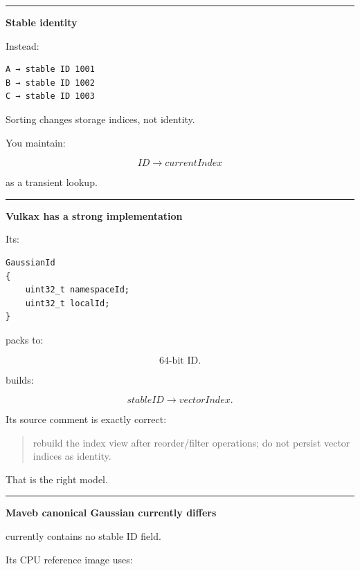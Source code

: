 \begin{center}\rule{0.5\linewidth}{0.5pt}\end{center}

\textbf{Stable identity}

Instead:

\protect{}\label{juc7yl}%
\begin{verbatim}
A → stable ID 1001
B → stable ID 1002
C → stable ID 1003
\end{verbatim}

Sorting changes storage indices, not identity.

You maintain:

\[
ID\rightarrow currentIndex
\]

as a transient lookup.

\begin{center}\rule{0.5\linewidth}{0.5pt}\end{center}

\textbf{Vulkax has a strong implementation}

Its:

\protect{}\label{t7ceps}%
\begin{verbatim}
GaussianId
{
    uint32_t namespaceId;
    uint32_t localId;
}
\end{verbatim}

packs to:

\[
64\text{-bit ID}.
\]

 builds:

\[
stableID\rightarrow vectorIndex.
\]

Its source comment is exactly correct:

\begin{quote}
rebuild the index view after reorder/filter operations; do not persist vector indices as identity.
\end{quote}

That is the right model.

\begin{center}\rule{0.5\linewidth}{0.5pt}\end{center}

\textbf{Maveb canonical Gaussian currently differs}

 currently contains no stable ID field.

Its CPU reference image uses:

